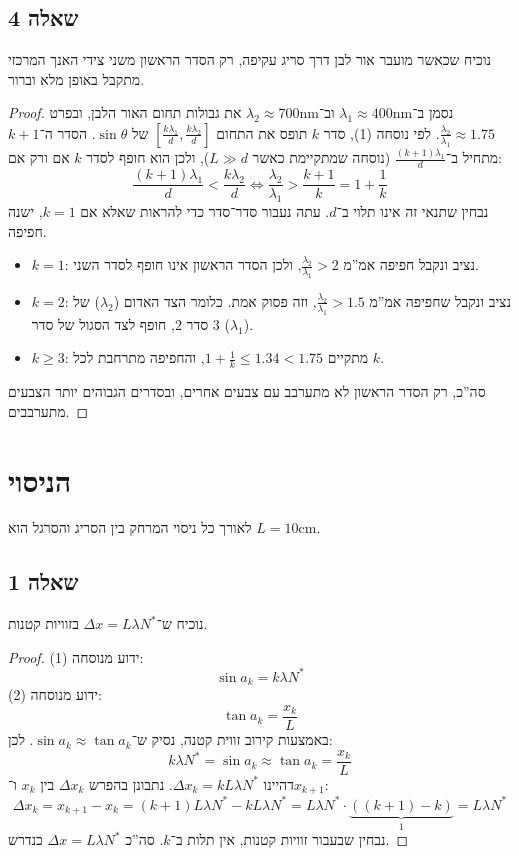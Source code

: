 \documentclass[]{../../../tex/classes/styledArticle}
\renewcommand\lg{\lambda}
\newcommand\cm{\mathrm{cm}}
\newcommand\mrm[1]{\mathrm{#1}}
\begin{document}
	\subsection{שאלה 4}
	נוכיח שכאשר מועבר אור לבן דרך סריג עקיפה, רק הסדר הראשון משני צידי האנך המרכזי מתקבל באופן מלא וברור. 
	\begin{proof}
		נסמן ב־$\lg_1 \approx 400\mrm{nm}$ וב־$\lg_2 \approx 700\mrm{nm}$ את גבולות תחום האור הלבן, ובפרט $\frac{\lg_2}{\lg_1} \approx 1.75$. לפי נוסחה (1), סדר $k$ תופס את התחום $\left[\frac{k\lg_1}{d}, \frac{k\lg_2}{d}\right]$ של $\sin\theta$. הסדר ה־$k + 1$ מתחיל ב־$\frac{(k + 1)\lg_1}{d}$ (נוסחה שמתקיימת כאשר $L\gg d$), ולכן הוא חופף לסדר $k$ אם ורק אם: 
		\[ \frac{(k + 1)\lg_1}{d} < \frac{k\lg_2}{d} \iff \frac{\lg_2}{\lg_1} > \frac{k + 1}{k} = 1 + \frac{1}{k} \]
		נבחין שתנאי זה אינו תלוי ב־$d$. עתה נעבור סדר־סדר כדי להראות שאלא אם $k = 1$, ישנה חפיפה. 
		\begin{itemize}
			\item $k = 1$: נציב ונקבל חפיפה אמ''מ $\frac{\lg_2}{\lg_1} > 2$, ולכן הסדר הראשון אינו חופף לסדר השני. 
			\item $k = 2$: נציב ונקבל שחפיפה אמ''מ $\frac{\lg_2}{\lg_1} > 1.5$, וזה פסוק אמת. כלומר הצד האדום ($\lg_2$) של סדר $2$, חופף לצד הסגול של סדר $3$ ($\lg_1$). 
			\item $k \ge 3$: מתקיים $1 + \frac{1}{k} \le 1.34 < 1.75$, והחפיפה מתרחבת לכל $k$. 
		\end{itemize}
		סה''כ, רק הסדר הראשון לא מתערבב עם צבעים אחרים, ובסדרים הגבוהים יותר הצבעים מתערבבים. 
	\end{proof}
	
	
	\section{הניסוי}
	לאורך כל ניסוי המרחק בין הסריג והסרגל הוא $L = 10\cm$. 
	\subsection{שאלה 1}
	נוכיח ש־$\Delta x = L \lg N^*$ בזוויות קטנות. 
	\begin{proof}
		ידוע מנוסחה (1): 
		\[ \sin a_k = k \lg N^* \]
		ידוע מנוסחה (2): 
		\[ \tan a_k = \frac{x_k}{L} \]
		באמצעות קירוב זווית קטנה, נסיק ש־$\sin a_k \approx \tan a_k$. לכן: 
		\[ k\lg N^* = \sin a_k \approx \tan a_k = \frac{x_k}{L} \]
		דהיינו $\Delta x_k = k L \lg N^*$. 
		נתבונן בהפרש $\Delta x_k$ בין $x_k$ ו־$x_{k +1}$: 
		\[ \Delta x_k = x_{k + 1} - x_k = (k + 1)L\lg N^* - kL\lg N^* = L\lg N^*\cdot\underbrace{((k + 1) - k)}_1 = L\lg N^*  \]
		נבחין שבעבור זוויות קטנות, אין תלות ב־$k$. סה''כ $\Delta x = L \lg N^*$ כנדרש. 
	\end{proof}
	
\end{document}
